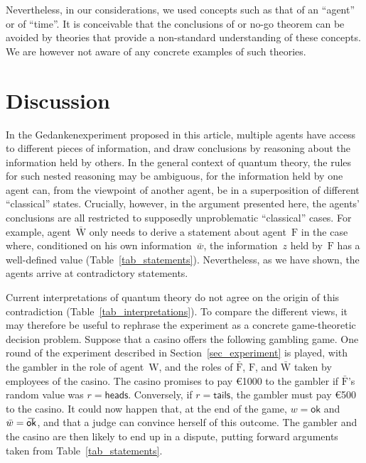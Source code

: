 \documentclass{article}
\theoremstyle{mystyle}
\theoremstyle{definition}
\newcommand{\oline}[2]{{\mkern#2mu\overline{\protect\vphantom{t}\mkern-#2mu\smash{#1}\mkern-#2mu}\mkern#2mu}}
\newcommand*{\Friendone}{\mathrm{\bar{F}}}
\newcommand*{\Friendtwo}{\mathrm{F}}
\newcommand*{\Assistant}{\mathrm{\bar{W}}}
\newcommand*{\Wigner}{\mathrm{W}}
\newcommand*{\wb}{\bar{w}}
\newcommand*{\ok}{\mathsf{ok}}
\newcommand*{\okb}{\oline{\ok}{2.8}}
\newcommand*{\head}{\mathsf{heads}}
\newcommand*{\tail}{\mathsf{tails}}
\begin{document}
Nevertheless, in our considerations, we used concepts such as that of an ``agent'' or of ``time''. It is conceivable that the conclusions of or no-go theorem can be avoided by theories that provide a non-standard understanding of these concepts. We are however not aware of any concrete examples of such theories. 


\section{Discussion} \label{sec_discussion}

In the Gedankenexperiment proposed in this article, multiple agents have access to different pieces of information, and draw conclusions by reasoning about the information held by others. In the general context of quantum theory, the rules for such nested reasoning may be ambiguous, for the information held by one agent can, from the viewpoint of another agent, be in a superposition of different ``classical'' states. Crucially, however,  in the argument presented here, the agents' conclusions are all restricted to  supposedly unproblematic ``classical'' cases. For example, agent~$\Assistant$ only needs to derive a statement about agent~$\Friendtwo$ in the case where, conditioned on his own information~$\wb$, the information~$z$ held by~$\Friendtwo$ has a well-defined value  (Table~\ref{tab_statements}). Nevertheless, as we have shown, the agents arrive at contradictory statements.

Current interpretations of quantum theory do not agree on the origin of this contradiction (Table~\ref{tab_interpretations}). To compare the different views, it may therefore be useful to rephrase the experiment as a concrete game-theoretic decision problem.  Suppose that a casino offers the following gambling game.  One round of the experiment described in Section~\ref{sec_experiment} is played, with the gambler in the role of agent~$\Wigner$, and the roles of $\Friendone$, $\Friendtwo$, and $\Assistant$ taken by employees of the casino. The casino promises to pay \euro{1000} to the gambler if  $\Friendone$'s random value was $r=\head$. Conversely, if $r=\tail$, the gambler must pay \euro{500} to the casino.  It could now happen that, at the end of the game, $w=\ok$ and $\wb=\okb$, and that a judge can convince herself of this outcome. The gambler and the casino are then likely to end up in a dispute, putting forward arguments taken from Table~\ref{tab_statements}.

\smallskip
\end{document}
